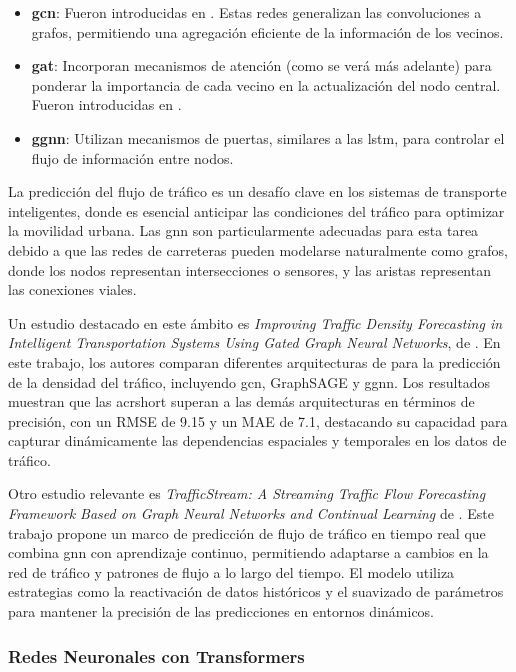 \begin{itemize}
	\item \textbf{\acrlong{gcn}}: Fueron introducidas en \cite{theoryGcn}. Estas redes generalizan las convoluciones a grafos, permitiendo una agregación eficiente de la información de los vecinos.
	\item \textbf{\acrlong{gat}}: Incorporan mecanismos de atención (como se verá más adelante) para ponderar la importancia de cada vecino en la actualización del nodo central. Fueron introducidas en \cite{theoryGan}.
	\item \textbf{\acrlong{ggnn}}: Utilizan mecanismos de puertas, similares a las \acrshort{lstm}, para controlar el flujo de información entre nodos.
\end{itemize}

La predicción del flujo de tráfico es un desafío clave en los sistemas de transporte inteligentes, donde es esencial anticipar las condiciones del tráfico para optimizar la movilidad urbana. Las \acrshort{gnn} son particularmente adecuadas para esta tarea debido a que las redes de carreteras pueden modelarse naturalmente como grafos, donde los nodos representan intersecciones o sensores, y las aristas representan las conexiones viales.

Un estudio destacado en este ámbito es \textit{Improving Traffic Density Forecasting in Intelligent Transportation Systems Using Gated Graph Neural Networks}, de \cite{forecastGgnn}. En este trabajo, los autores comparan diferentes arquitecturas de \cite{gnn} para la predicción de la densidad del tráfico, incluyendo \acrshort{gcn}, GraphSAGE y \acrshort{ggnn}. Los resultados muestran que las acrshort superan a las demás arquitecturas en términos de precisión, con un RMSE de 9.15 y un MAE de 7.1, destacando su capacidad para capturar dinámicamente las dependencias espaciales y temporales en los datos de tráfico.​

Otro estudio relevante es \textit{TrafficStream: A Streaming Traffic Flow Forecasting Framework Based on Graph Neural Networks and Continual Learning} de \cite{forecastGnn}. Este trabajo propone un marco de predicción de flujo de tráfico en tiempo real que combina \acrshort{gnn} con aprendizaje continuo, permitiendo adaptarse a cambios en la red de tráfico y patrones de flujo a lo largo del tiempo. El modelo utiliza estrategias como la reactivación de datos históricos y el suavizado de parámetros para mantener la precisión de las predicciones en entornos dinámicos.​

\subsubsection{Redes Neuronales con Transformers}

